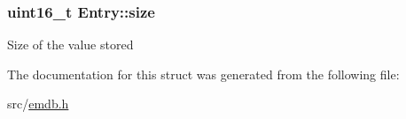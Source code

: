 \subsubsection[{size}]{\setlength{\rightskip}{0pt plus 5cm}uint16\+\_\+t Entry\+::size}\label{struct_entry_a982728099c1c8bf6e6eb24736f9cc8f3}
Size of the value stored 

The documentation for this struct was generated from the following file\+:\begin{DoxyCompactItemize}
\item 
src/\hyperlink{emdb_8h}{emdb.\+h}\end{DoxyCompactItemize}
